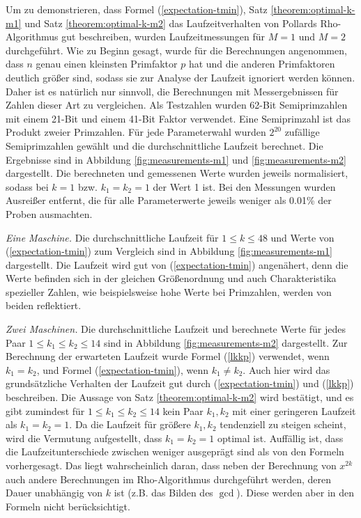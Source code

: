 \documentclass[a4paper, 11pt, ngerman]{article}
\begin{document}
Um zu demonstrieren, dass Formel (\ref{expectation-tmin}), Satz \ref{theorem:optimal-k-m1} und Satz \ref{theorem:optimal-k-m2} das Laufzeitverhalten von Pollards Rho-Algorithmus gut beschreiben, wurden Laufzeitmessungen für $M = 1$ und $M = 2$ durchgeführt. Wie zu Beginn gesagt, wurde für die Berechnungen angenommen, dass $n$ genau einen kleinsten Primfaktor $p$ hat und die anderen Primfaktoren deutlich größer sind, sodass sie zur Analyse der Laufzeit ignoriert werden können. Daher ist es natürlich nur sinnvoll, die Berechnungen mit Messergebnissen für Zahlen dieser Art zu vergleichen. Als Testzahlen wurden 62-Bit Semiprimzahlen mit einem 21-Bit und einem 41-Bit Faktor verwendet. Eine Semiprimzahl ist das Produkt zweier Primzahlen. Für jede Parameterwahl wurden $2^{20}$ zufällige Semiprimzahlen gewählt und die durchschnittliche Laufzeit berechnet. Die Ergebnisse sind in Abbildung \ref{fig:measurements-m1} und \ref{fig:measurements-m2} dargestellt. Die berechneten und gemessenen Werte wurden jeweils normalisiert, sodass bei $k = 1$ bzw. $k_1 = k_2 = 1$ der Wert 1 ist. Bei den Messungen wurden Ausreißer entfernt, die für alle Parameterwerte jeweils weniger als 0.01\% der Proben ausmachten.

\emph{Eine Maschine.} Die durchschnittliche Laufzeit für $1 \le k \le 48$ und Werte von (\ref{expectation-tmin}) zum Vergleich sind in Abbildung \ref{fig:measurements-m1} dargestellt. Die Laufzeit wird gut von (\ref{expectation-tmin}) angenähert, denn die Werte befinden sich in der gleichen Größenordnung und auch Charakteristika spezieller Zahlen, wie beispielsweise hohe Werte bei Primzahlen, werden von beiden reflektiert.

\emph{Zwei Maschinen.} Die durchschnittliche Laufzeit und berechnete Werte für jedes Paar $1 \le k_1 \le k_2 \le 14$ sind in Abbildung \ref{fig:measurements-m2} dargestellt. Zur Berechnung der erwarteten Laufzeit wurde Formel (\ref{lkkp}) verwendet, wenn $k_1 = k_2$, und Formel (\ref{expectation-tmin}), wenn $k_1 \ne k_2$. Auch hier wird das grundsätzliche Verhalten der Laufzeit gut durch (\ref{expectation-tmin}) und (\ref{lkkp}) beschreiben. Die Aussage von Satz \ref{theorem:optimal-k-m2} wird bestätigt, und es gibt zumindest für $1 \le k_1 \le k_2 \le 14$ kein Paar $k_1, k_2$ mit einer geringeren Laufzeit als $k_1 = k_2 = 1$. Da die Laufzeit für größere $k_1, k_2$ tendenziell zu steigen scheint, wird die Vermutung aufgestellt, dass $k_1 = k_2 = 1$ optimal ist. Auffällig ist, dass die Laufzeitunterschiede zwischen weniger ausgeprägt sind als von den Formeln vorhergesagt. Das liegt wahrscheinlich daran, dass neben der Berechnung von $x^{2k}$ auch andere Berechnungen im Rho-Algorithmus durchgeführt werden, deren Dauer unabhängig von $k$ ist (z.B. das Bilden des $\gcd$). Diese werden aber in den Formeln nicht berücksichtigt.
\end{document}
